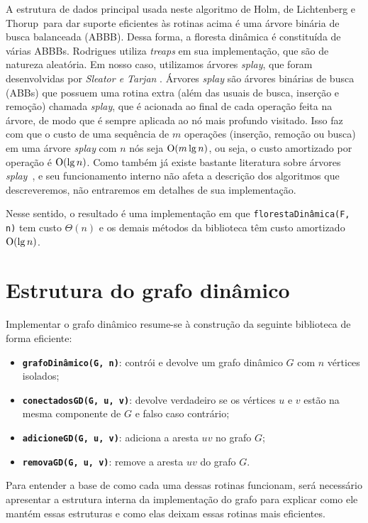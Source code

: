A estrutura de dados principal usada neste algoritmo de Holm, de Lichtenberg e Thorup~para dar suporte eficientes às rotinas acima é uma árvore binária de busca balanceada (ABBB). Dessa forma, a floresta dinâmica é constituída de várias ABBBs. Rodrigues utiliza \textit{treaps} em sua implementação, que são de natureza aleatória. Em nosso caso, utilizamos árvores \textit{splay}, que foram desenvolvidas por \textit{Sleator e Tarjan} \cite{sleator}. Árvores \textit{splay} são árvores binárias de busca (ABBs) que possuem uma rotina extra (além das usuais de busca, inserção e remoção) chamada \textit{splay}, que é acionada ao final de cada operação feita na árvore, de modo que é sempre aplicada ao nó mais profundo visitado. Isso faz com que o custo de uma sequência de $m$ operações (inserção, remoção ou busca) em uma árvore \textit{splay} com $n$ nós seja $\mathrm{O}(m\lg n)$, ou seja, o custo amortizado por operação é $\mathrm{O}(\lg n)$. Como também já existe bastante literatura sobre árvores \textit{splay}~\cite[Lecture 12]{kozen}, e seu funcionamento interno não afeta a descrição dos algoritmos que descreveremos, não entraremos em detalhes de sua implementação.

Nesse sentido, o resultado é uma implementação em que \texttt{florestaDinâmica(F, n)} tem custo $\Theta(n)$ e os demais métodos da biblioteca têm custo amortizado $\mathrm{O}(\lg n)$.

\section{Estrutura do grafo dinâmico}
\label{sec:dynamic-graph-structure}

Implementar o grafo dinâmico resume-se à construção da seguinte biblioteca de forma eficiente:

\begin{itemize}
    \item \texttt{\textbf{grafoDinâmico(G, n)}}: contrói e devolve um grafo dinâmico $G$ com $n$ vértices isolados;
    \item \texttt{\textbf{conectadosGD(G, u, v)}}: devolve verdadeiro se os vértices $u$ e $v$ estão na mesma componente de $G$ e falso caso contrário;
    \item \texttt{\textbf{adicioneGD(G, u, v)}}: adiciona a aresta $uv$ no grafo $G$;
    \item \texttt{\textbf{removaGD(G, u, v)}}: remove a aresta $uv$ do grafo $G$.
\end{itemize} 

Para entender a base de como cada uma dessas rotinas funcionam, será necessário apresentar a estrutura interna da implementação do grafo para explicar como ele mantém essas estruturas e como elas deixam essas rotinas mais eficientes.

